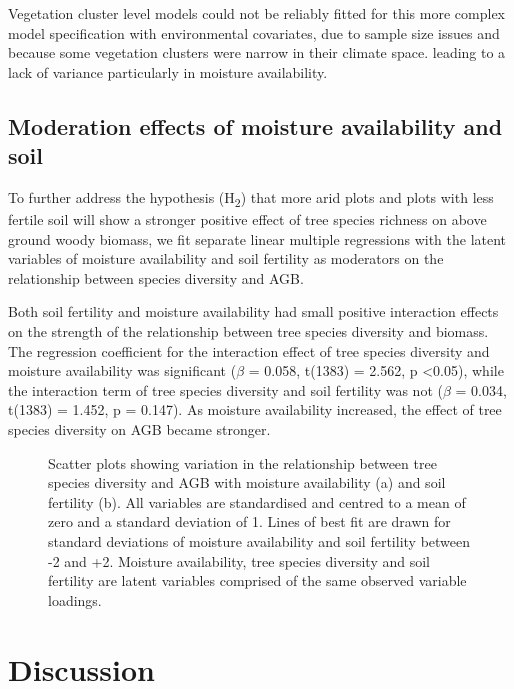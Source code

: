 \documentclass[11pt,a4paper]{article}
\begin{document}
Vegetation cluster level models could not be reliably fitted for this more complex model specification with environmental covariates, due to sample size issues and because some vegetation clusters were narrow in their climate space. leading to a lack of variance particularly in moisture availability.


\subsection{Moderation effects of moisture availability and soil}

To further address the hypothesis (H\textsubscript{2}) that more arid plots and plots with less fertile soil will show a stronger positive effect of tree species richness on above ground woody biomass, we fit separate linear multiple regressions with the latent variables of moisture availability and soil fertility as moderators on the relationship between species diversity and AGB.

Both soil fertility and moisture availability had small positive interaction effects on the strength of the relationship between tree species diversity and biomass. The regression coefficient for the interaction effect of tree species diversity and moisture availability was significant ($\beta$ = 0.058, t(1383) = 2.562, p <0.05), while the interaction term of tree species diversity and soil fertility was not ($\beta$ = 0.034, t(1383) = 1.452, p = 0.147). As moisture availability increased, the effect of tree species diversity on AGB became stronger. 


\begin{figure}[H]
\centering
	\caption{Scatter plots showing variation in the relationship between tree species diversity and AGB with moisture availability (a) and soil fertility (b). All variables are standardised and centred to a mean of zero and a standard deviation of 1. Lines of best fit are drawn for standard deviations of moisture availability and soil fertility between -2 and +2. Moisture availability, tree species diversity and soil fertility are latent variables comprised of the same observed variable loadings.}
	\label{int_plots}
\end{figure}

\section{Discussion}
\end{document}
